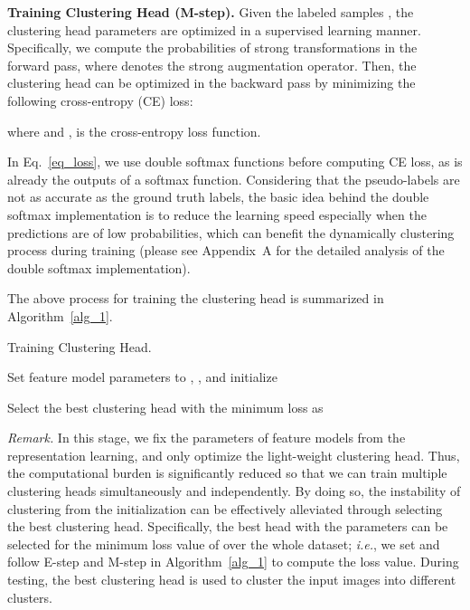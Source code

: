 \documentclass[journal]{IEEEtran}
\newcommand{\ie}{\emph{i.e.}\xspace}
\begin{document}
\noindent\textbf{Training Clustering Head (M-step).} 
Given the labeled samples , the clustering head parameters are optimized  in a supervised learning manner.
Specifically, 
we compute the probabilities of strong transformations   in the forward pass, where  denotes the strong augmentation operator.
Then, the clustering head  can be optimized in the backward pass by minimizing the following cross-entropy (CE) loss:

where  and  
        , 
 is the cross-entropy loss function.

In Eq.~\eqref{eq_loss}, we use double softmax functions before computing CE loss, as  is already the outputs of a softmax function.
Considering that the pseudo-labels are not as accurate as the ground truth labels, the basic idea behind the double softmax implementation is to reduce the learning speed especially when the predictions are of low probabilities, which can benefit the dynamically clustering process during training 
(please see Appendix~A for the detailed analysis of the double softmax implementation).


The above process for training the clustering head is summarized in Algorithm~\ref{alg_1}.



\begin{algorithm}
\scriptsize
\label{alg_1}
\caption{Training Clustering Head.}
\LinesNumbered
{}
Set feature model parameters to , , and initialize  \;

Select the best clustering head with the minimum loss as  \;

\ForEach{}{
         \;
        \;
}
\end{algorithm}

\noindent\emph{Remark.} In this stage, we fix the parameters of feature models from the representation learning, and only optimize the light-weight clustering head. Thus, the computational burden is significantly reduced so that we can train multiple clustering heads simultaneously and independently. By doing so, the instability of clustering from the initialization can be effectively alleviated through selecting the best 
clustering head. Specifically, the best head with the parameters  can be selected for the minimum loss value of  over the whole dataset; \ie, we set  and follow E-step and M-step in Algorithm~\ref{alg_1} to compute the loss value.
During testing, the best clustering head is used to cluster the input images into different clusters.
\end{document}
